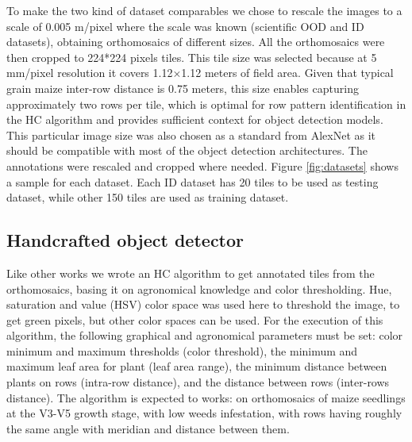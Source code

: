 \documentclass[journal,article,submit,pdftex,moreauthors]{Definitions/mdpi}
\begin{document}
To make the two kind of dataset comparables we chose to rescale the images to a scale of 0.005 m/pixel
where the scale was known (scientific OOD and ID datasets), obtaining orthomosaics of different sizes.
All the orthomosaics were then cropped to 224*224 pixels tiles.
This tile size was selected because at 5 mm/pixel resolution it covers 1.12×1.12 meters of field area.
Given that typical grain maize inter-row distance is 0.75 meters, this size enables capturing 
approximately two rows per tile, which is optimal for row pattern identification in the HC algorithm 
and provides sufficient context for object detection models.
This particular image size was also chosen as a standard from AlexNet \cite{krizhevskyImageNetClassificationDeep2012}
as it should be compatible with most of the object detection architectures.
The annotations were rescaled and cropped where needed.
Figure \ref{fig:datasets} shows a sample for each dataset.
Each ID dataset has 20 tiles to be used as testing dataset, while other 
150 tiles are used as training dataset.

\subsection{Handcrafted object detector}

Like other works \cite{davidPlantDetectionCounting2021,garcia-martinezDigitalCountCorn2020,liuEstimatingMaizeSeedling2022} 
we wrote an HC algorithm to get annotated tiles from the orthomosaics, 
basing it on agronomical knowledge and color thresholding.
Hue, saturation and value (HSV) color space was used here to threshold the image,
to get green pixels, but other color spaces can be used.
For the execution of this algorithm, the following graphical and agronomical 
parameters must be set: color minimum and maximum thresholds (color threshold), the minimum and maximum 
leaf area for plant (leaf area range), the minimum distance between plants on rows (intra-row distance),
and the distance between rows (inter-rows distance). 
The algorithm is expected to works: on orthomosaics of maize seedlings at the V3-V5 growth stage,
with low weeds infestation, with rows having roughly the same angle with meridian and distance between them.
\end{document}
